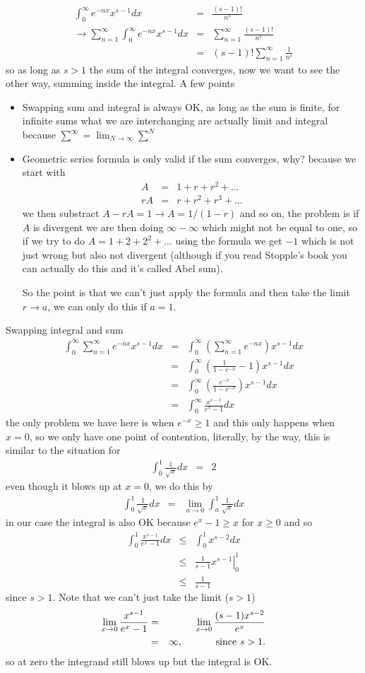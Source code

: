 \documentclass[aps,preprint,preprintnumbers,nofootinbib,showpacs,prd]{revtex4-1}
\newcommand{\bit}{\begin{itemize}}
\newcommand{\eit}{\end{itemize}}
\newcommand{\nbea}{\begin{eqnarray*}}
\newcommand{\neea}{\end{eqnarray*}}
\begin{document}
%
\nbea
\int_0^\infty e^{-nx} x^{s-1} dx & = & \frac{(s-1)!}{n^s} \\
\to \sum_{n=1}^\infty \int_0^\infty e^{-nx} x^{s-1} dx & = & \sum_{n=1}^\infty \frac{(s-1)!}{n^s} \\
& = & (s-1)!\sum_{n=1}^\infty \frac{1}{n^s}
\neea
%
so as long as $s > 1$ the sum of the integral converges, now we want to see the other way, summing inside the integral. A few points
%
\bit
\item Swapping sum and integral is always OK, as long as the sum is finite, for infinite sums what we are interchanging are actually limit and integral because $\sum^\infty = \lim_{N\to\infty}\sum^N$
%
\item Geometric series formula is only valid if the sum converges, why? because we start with
%
\nbea
A & = & 1 + r + r^2 + \dots \\
rA & = & r + r^2 + r^3 + \dots
\neea
%
we then substract $A - rA = 1\to A = 1/(1-r)$ and so on, the problem is if $A$ is divergent we are then doing $\infty - \infty$ which might not be equal to one, so if we try to do $A = 1 + 2 + 2^2 + \dots$ using the formula we get $-1$ which is not just wrong but also not divergent (although if you read Stopple's book you can actually do this and it's called Abel sum).

So the point is that we can't just apply the formula and then take the limit $r\to a$, we can only do this if $a = 1$.
\eit
%

Swapping integral and sum
%
\nbea
\int_0^\infty \sum_{n=1}^\infty e^{-nx} x^{s-1} dx & = & \int_0^\infty \left(\sum_{n=1}^\infty e^{-nx}\right) x^{s-1} dx \\
& = & \int_0^\infty \left (\frac{1}{1-e^{-x}} - 1 \right ) x^{s-1} dx \\
& = & \int_0^\infty \left (\frac{e^{-x}}{1-e^{-x}}\right ) x^{s-1} dx \\
& = & \int_0^\infty \frac{x^{s-1}}{e^{x} - 1} dx
\neea
%
the only problem we have here is when $e^{-x} \ge 1$ and this only happens when $x = 0$, so we only have one point of contention, literally, by the way, this is similar to the situation for
%
\nbea
\int_0^1 \frac{1}{\sqrt{x}} dx & = & 2
\neea
%
even though it blows up at $x = 0$, we do this by
%
\nbea
\int_0^1 \frac{1}{\sqrt{x}} dx & = & \lim_{a\to0}\int_a^1 \frac{1}{\sqrt{x}} dx
\neea
%
in our case the integral is also OK because $e^x - 1 \ge x$ for $x \ge 0$ and so
%
\nbea
\int_0^1 \frac{x^{s-1}}{e^{x} - 1} dx & \le & \int_0^1 x^{s-2} dx \\
& \le & \left. \frac{1}{s-1} x^{s-1} \right |_0^1 \\
& \le & \frac{1}{s-1}
\neea
%
since $s > 1$. Note that we can't just take the limit ($s > 1$)
%
\nbea
\lim_{x\to0} \frac{x^{s-1}}{e^x-1} & = & \lim_{x\to0} \frac{(s-1)x^{s-2}}{e^x} \\
& = & \infty, ~~~~~~~~~~{\rm  since~} s > 1.
\neea
%
so at zero the integrand still blows up but the integral is OK.
\end{document}
